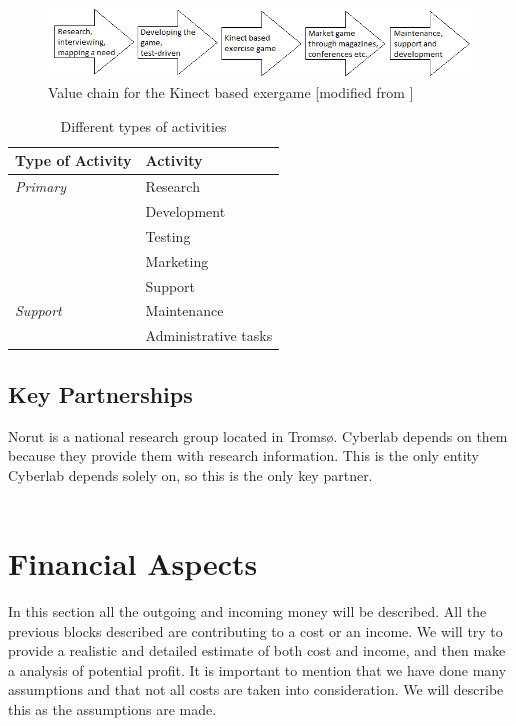 \begin{figure}
\begin{center}
\includegraphics[scale=0.7]{valuechaincase}
\caption[Value Chain for the Kinect Based Exergame]{Value chain for the Kinect based exergame [modified from \cite{osterwalderthesis}]}
\label{fig:ValueChainCase}
\end{center}
\end{figure}

\begin{table}
\centering
    \begin{tabular}{|l|l|}
        \hline
        \textbf{Type of Activity} & \textbf{Activity} \\ \hline
        \emph{Primary} & Research \\ \cline{2-2}
        & Development \\ \cline{2-2}
	 	& Testing \\ \cline{2-2}
	 	& Marketing \\ \cline{2-2}
	 	& Support \\ \hline
	 	 \emph{Support} & Maintenance \\ \cline{2-2}
	   	& Administrative tasks \\
       \hline
    \end{tabular}
    \caption[Different types of activities ]{Different types of activities}
    \label{tab:activities}
\end{table}

\newpage

\subsection{Key Partnerships}

Norut is a national research group located in Tromsø. Cyberlab depends on them because they provide them with research information. This is the only entity Cyberlab depends solely on, so this is the only key partner. \\ \\ 

\section{Financial Aspects}
In this section all the outgoing and incoming money will be described. All the previous blocks described are contributing to a cost or an income. We will try to provide a realistic and detailed estimate of both cost and income, and then make a analysis of potential profit. It is important to mention that we have done many assumptions and that not all costs are taken into consideration. We will describe this as the assumptions are made.

